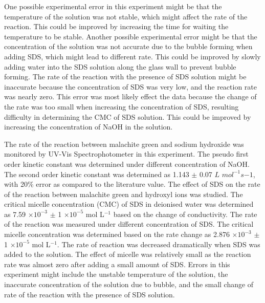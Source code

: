 \documentclass[twocolumn]{article} %
\begin{document}
One possible experimental error in this experiment might be that the temperature of the solution was not stable, which might affect the rate of the reaction. This could be improved by increasing the time for waiting the temperature to be stable. Another possible experimental error might be that the concentration of the solution was not accurate due to the bubble forming when adding SDS, which might lead to different rate. This could be improved by slowly adding water into the SDS solution along the glass wall to prevent bubble forming. The rate of the reaction with the presence of SDS solution might be inaccurate because the concentration of SDS was very low, and the reaction rate was nearly zero. This error was most likely effect the data  because the change of the rate was too small when increasing the concentration of SDS, resulting difficulty in determining the CMC of SDS solution. This could be improved by increasing the concentration of NaOH in the solution. 


The rate of the reaction between malachite green and sodium hydroxide was monitored by UV-Vis Spectrophotometer in this experiment. The pseudo first order kinetic constant was determined under different concentration of NaOH. The second order kinetic constant was determined as 1.143 $\pm$ 0.07 $L$ $mol^{-1}s{-1}$, with 20\% error as compared to the literature value. The effect of SDS on the rate of the reaction between malachite green and hydroxyl ions was studied. The critical micelle concentration (CMC) of SDS in deionised water was determined as 7.59 $\times 10^{-3}$ $\pm$ 1 $\times 10^{-5}$ mol L$^{-1}$ based on the change of conductivity. The rate of the reaction was measured under different concentration of SDS. The critical micelle concentration was determined based on the rate change as 2.876 $\times 10^{-3}$ $\pm$ 1 $\times 10^{-5}$ mol L$^{-1}$. The rate of reaction was decreased dramatically when SDS was added to the solution. The effect of micelle was relatively small as the reaction rate was almost zero after adding a small amount of SDS. Errors in this experiment might include the unstable temperature of the solution, the inaccurate concentration of the solution due to bubble, and the small change of rate of the reaction with the presence of SDS solution. 



\end{document}
